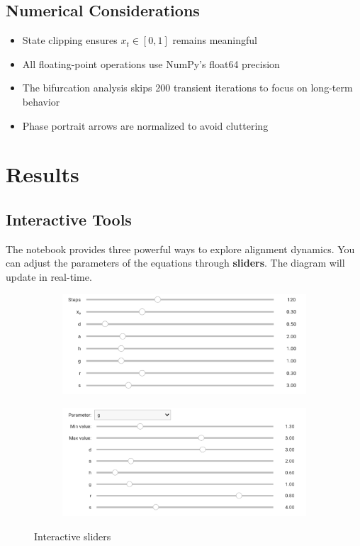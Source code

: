 \documentclass[a4paper, 10pt]{article}
\begin{document}
\subsection{Numerical Considerations}
\begin{itemize}
	\item State clipping ensures $x_t \in [0,1]$ remains meaningful
	\item All floating-point operations use NumPy's float64 precision
	\item The bifurcation analysis skips 200 transient iterations to focus on long-term behavior
	\item Phase portrait arrows are normalized to avoid cluttering
\end{itemize}

\clearpage
\section{Results}
\subsection{Interactive Tools}
The notebook provides three powerful ways to explore alignment dynamics. 
You can adjust the parameters of the equations through \textbf{sliders}. The diagram will update in real-time.

\begin{figure}[h!]
    \centering
    \begin{subfigure}{0.45\textwidth}
        \centering
        \includegraphics[width=\linewidth]{../images/results/sliders1.pdf}
        \label{fig:sliders1}
    \end{subfigure}
    \hfill
    \begin{subfigure}{0.45\textwidth}
        \centering
        \includegraphics[width=\linewidth]{../images/results/sliders2.pdf}
        \label{fig:sliders2}
    \end{subfigure}
    \caption{Interactive sliders}
    \label{fig:side_by_side}
\end{figure}
\end{document}
